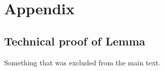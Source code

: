 \appendix %
\renewcommand{\theequation}{\Alph{chapter}.\arabic{equation}}
\chapter{Appendix}

\section{Technical proof of Lemma} %
\label{sec:alternate_proof_of_lemma}

Something that was excluded from the main text.


